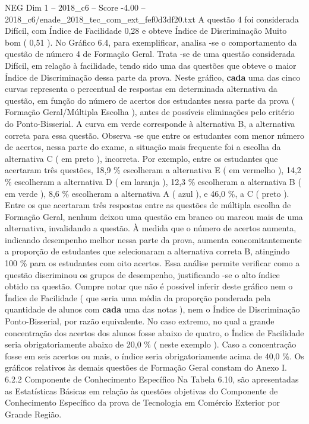 \begin{textsample}{NEG Dim 1 – 2018\_c6 – Score -4.00 – 2018\_c6/enade\_2018\_tec\_com\_ext\_fef0d3df20.txt}
A questão 4 foi considerada Difícil, com Índice de Facilidade 0,28 e obteve Índice de Discriminação Muito bom ( 0,51 ).
No Gráfico 6.4, para exemplificar, analisa -se o comportamento da questão de número 4 de Formação Geral.
Trata -se de uma questão considerada Difícil, em relação à facilidade, tendo sido uma das questões que obteve o maior Índice de Discriminação dessa parte da prova.
Neste gráfico, \textbf{cada} uma das cinco curvas representa o percentual de respostas em determinada alternativa da questão, em função do número de acertos dos estudantes nessa parte da prova ( Formação Geral/Múltipla Escolha ), antes de possíveis eliminações pelo critério do Ponto-Bisserial.
A curva em verde corresponde à alternativa B, a alternativa correta para essa questão.
Observa -se que entre os estudantes com menor número de acertos, nessa parte do exame, a situação mais frequente foi a escolha da alternativa C ( em preto ), incorreta.
Por exemplo, entre os estudantes que acertaram três questões, 18,9 \% escolheram a alternativa E ( em vermelho ), 14,2 \% escolheram a alternativa D ( em laranja ), 12,3 \% escolheram a alternativa B ( em verde ), 8,6 \% escolheram a alternativa A ( azul ), e 46,0 \%, a C ( preto ).
Entre os que acertaram três respostas entre as questões de múltipla escolha de Formação Geral, nenhum deixou uma questão em branco ou marcou mais de uma alternativa, invalidando a questão.
À medida que o número de acertos aumenta, indicando desempenho melhor nessa parte da prova, aumenta concomitantemente a proporção de estudantes que selecionaram a alternativa correta B, atingindo 100 \% para os estudantes com oito acertos.
Essa análise permite verificar como a questão discriminou os grupos de desempenho, justificando -se o alto índice obtido na questão.
Cumpre notar que não é possível inferir deste gráfico nem o Índice de Facilidade ( que seria uma média da proporção ponderada pela quantidade de alunos com \textbf{cada} uma das notas ), nem o Índice de Discriminação Ponto-Bisserial, por razão equivalente.
No caso extremo, no qual a grande concentração dos acertos dos alunos fosse abaixo de quatro, o Índice de Facilidade seria obrigatoriamente abaixo de 20,0 \% ( neste exemplo ).
Caso a concentração fosse em seis acertos ou mais, o índice seria obrigatoriamente acima de 40,0 \%.
Os gráficos relativos às demais questões de Formação Geral constam do Anexo I. 6.2.2 Componente de Conhecimento Específico Na Tabela 6.10, são apresentadas as Estatísticas Básicas em relação às questões objetivas do Componente de Conhecimento Específico da prova de Tecnologia em Comércio Exterior por Grande Região.

\end{textsample}
